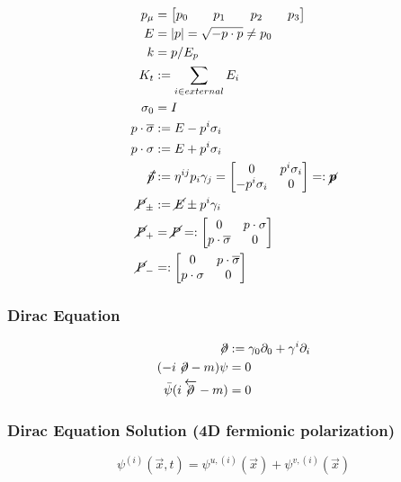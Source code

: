 \documentclass[11pt,a4paper]{article}
\begin{document}
\begin{align*}
p_{\mu } & =\begin{bmatrix}
p_{0} &  & p_{1} &  & p_{2} &  & p_{3}
\end{bmatrix}\\
E & =| p| =\sqrt{-p\cdot p} \neq p_{0}\\
k & =p/E_{p}\\
K_{t} & :=\sum _{i\in external} E_{i}\\
\sigma _{0} & =I\\
p\cdot \overline{\sigma } & :=E-p^{i} \sigma _{i}\\
p\cdot \sigma  & :=E+p^{i} \sigma _{i}\\
\cancel{\vec{p}} & :=\eta ^{ij} p_{i} \gamma _{j} =\begin{bmatrix}
0 & p^{i} \sigma _{i}\\
-p^{i} \sigma _{i} & 0
\end{bmatrix}=:\cancel{\boldsymbol{p}}\\
\cancel{P}_{\pm } & :=\cancel{E} \pm p^{i} \gamma _{i}\\
\cancel{P}_{+} & =\cancel{P}=:\begin{bmatrix}
0 & p\cdot \sigma \\
p\cdot \overline{\sigma } & 0
\end{bmatrix}\\
\cancel{P}_{-} & =:\begin{bmatrix}
0 & p\cdot \overline{\sigma }\\
p\cdot \sigma  & 0
\end{bmatrix}
\end{align*}

\subsubsection{Dirac Equation}
\begin{align*}
    \not \!\partial &:= \gamma_0\partial_0  + \gamma^i\partial_i  \\
     (-i\not \! \partial-m ) \psi &=0\\
     \bar\psi (i\not \! \! \overleftarrow\partial-m )  &= 0
\end{align*}
\subsubsection{Dirac Equation Solution (4D fermionic polarization)}

\[ \psi^{(i)}(\vec{x},t) =  \psi^{u,(i)}(\vec{x}) + \psi^{v,(i)}(\vec{x}) \]
    
\end{document}
